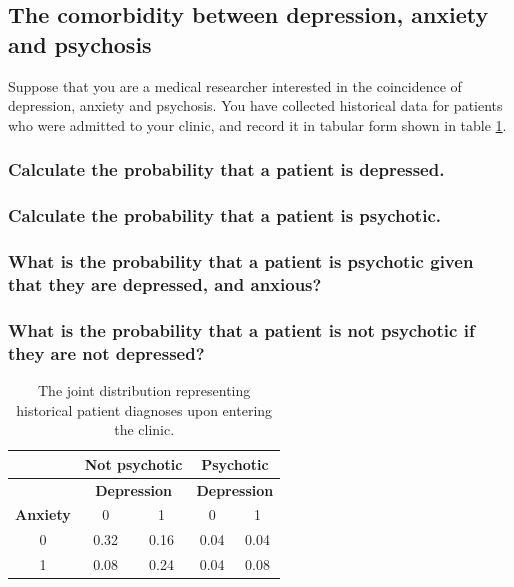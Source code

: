 \documentclass[11pt,fullpage]{book}
\begin{document}
\subsection{The comorbidity between depression, anxiety and psychosis}
Suppose that you are a medical researcher interested in the coincidence of depression, anxiety and psychosis. You have collected historical data for patients who were admitted to your clinic, and record it in tabular form shown in table \ref{tab:Denominator_PS_anxietyDepression}. 

\subsubsection{Calculate the probability that a patient is depressed.}
\subsubsection{Calculate the probability that a patient is psychotic.}
\subsubsection{What is the probability that a patient is psychotic given that they are depressed, and anxious?}
\subsubsection{What is the probability that a patient is not psychotic if they are not depressed?}

\begin{table}[htbp]
  \centering
    \begin{tabular}{rcccc}
    \toprule
          & \multicolumn{2}{c}{\textbf{Not psychotic}} & \multicolumn{2}{c}{\textbf{Psychotic}} \\
    \midrule
          & \multicolumn{2}{c}{\textbf{Depression}} & \multicolumn{2}{c}{\textbf{Depression}} \\
    \textbf{Anxiety} & 0     & 1     & 0     & 1 \\
    \multicolumn{1}{c}{0} & 0.32  & 0.16  & 0.04  & 0.04 \\
    \multicolumn{1}{c}{1} & 0.08  & 0.24  & 0.04  & 0.08 \\
    \bottomrule
    \end{tabular}%
  \caption{The joint distribution representing historical patient diagnoses upon entering the clinic.}\label{tab:Denominator_PS_anxietyDepression}%
\end{table}%
\end{document}
